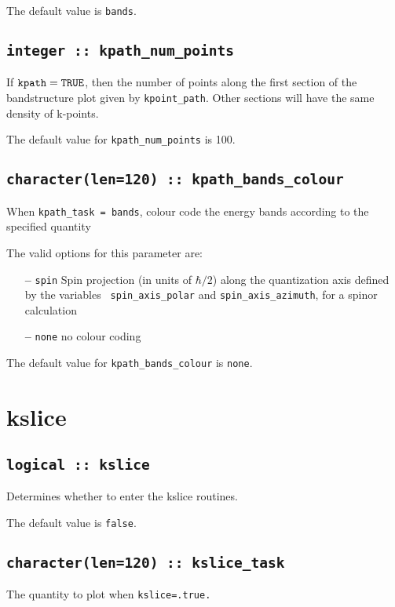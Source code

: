 The default value is {\tt bands}.


\subsection[kpath\_num\_points]{\tt integer :: kpath\_num\_points}

If $\verb#kpath#=\verb#TRUE#$, then the number of points along
the first section of the bandstructure plot given by
\verb#kpoint_path#. Other sections will have the same density of
k-points. 

The default value for \verb#kpath_num_points# is 100.


\subsection[kpath\_colour]{\tt character(len=120) ::
  kpath\_bands\_colour}
When {\tt kpath\_task = bands}, colour code the energy bands according
to the specified quantity

The valid options for this parameter are:
\begin{itemize}
\item[{\bf --}] \verb#spin# Spin projection (in units of $\hbar/2$)
  along the quantization axis defined by the variables {\tt
    spin\_axis\_polar} and {\tt spin\_axis\_azimuth}, for a spinor
  calculation
\item[{\bf --}]  \verb#none# no colour coding
\end{itemize}

The default value for {\tt kpath\_bands\_colour} is {\tt none}.


\clearpage
\section{kslice}

\subsection[berry]{\tt logical :: kslice}
Determines whether to enter the kslice routines.

The default value is \verb#false#.

\subsection[kslice\_task]{\tt character(len=120) ::  kslice\_task}
The quantity to plot when {\tt kslice=.true.} 

